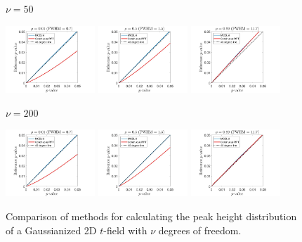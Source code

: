 \documentclass{article}
\begin{document}
\begin{figure}[!htp]
\begin{sideways}
\phantom{------------------}$\nu = 50$
\end{sideways}
\includegraphics[trim=70 5 100 5, clip,width=0.3\textwidth]{figure/2D_nu50_rho0.01_gauss.jpg}
\includegraphics[trim=70 5 100 5, clip,width=0.3\textwidth]{figure/2D_nu50_rho0.5_gauss.jpg}
\includegraphics[trim=70 5 100 5, clip,width=0.3\textwidth]{figure/2D_nu50_rho0.99_gauss.jpg}

\begin{sideways}
\phantom{------------------}$\nu = 200$
\end{sideways}
\includegraphics[trim=70 5 100 5, clip,width=0.3\textwidth]{figure/2D_nu200_rho0.01_gauss.jpg}
\includegraphics[trim=70 5 100 5, clip,width=0.3\textwidth]{figure/2D_nu200_rho0.5_gauss.jpg}
\includegraphics[trim=70 5 100 5, clip,width=0.3\textwidth]{figure/2D_nu200_rho0.99_gauss.jpg}
\caption{Comparison of methods for calculating the peak height distribution of a Gaussianized 2D $t$-field with $\nu$ degrees of freedom. \label{fig.t2gauss2D}}
\end{figure}
\end{document}
